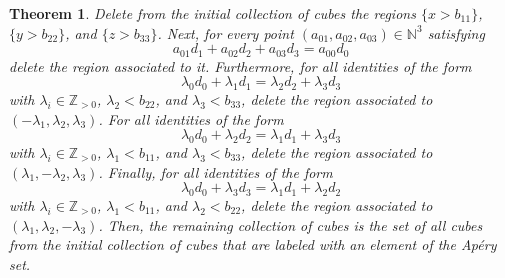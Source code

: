 \documentclass[12pt]{article}
\newtheorem{thm}{Theorem}[section]
\theoremstyle{remark}
\begin{document}
\begin{thm}\label{theoremprocedure}
    Delete from the initial collection of cubes the regions $\{x > b_{11}\}$, $\{y > b_{22}\}$, and $\{z > b_{33}\}$.
    Next, for every point $(a_{01},a_{02},a_{03}) \in \mathbb{N}^3$ satisfying
     \begin{equation}\label{minrelation-0}
          a_{01} d_1 + a_{02}d_2 + a_{03} d_3 = a_{00} d_0
     \end{equation}
    delete the region associated to it. 
    Furthermore, for all identities of the form
     \begin{equation}\label{theoremprocedure_eq1}
         \lambda_0d_0 + \lambda_1d_1=\lambda_2d_2 + \lambda_3d_3
     \end{equation}
    with $\lambda_i \in \mathbb{Z}_{>0}$, $\lambda_2 < b_{22}$, and $\lambda_3 < b_{33}$, delete the region associated to $(-\lambda_1,\lambda_2,\lambda_3)$. For all identities of the form
    \begin{equation}\label{theoremprocedure_eq2}
         \lambda_0d_0 + \lambda_2d_2=\lambda_1d_1 + \lambda_3d_3
    \end{equation}
    with $\lambda_i \in \mathbb{Z}_{>0}$, $\lambda_1 < b_{11}$, and $\lambda_3 < b_{33}$, delete the region associated to $(\lambda_1,-\lambda_2,\lambda_3)$. Finally, for all identities of the form
    \begin{equation}\label{theoremprocedure_eq3}
        \lambda_0d_0 + \lambda_3d_3=\lambda_1d_1 + \lambda_2d_2
    \end{equation}
    with $\lambda_i \in \mathbb{Z}_{>0}$, $\lambda_1 < b_{11}$, and $\lambda_2 < b_{22}$, delete the region associated to $(\lambda_1,\lambda_2,-\lambda_3)$.
    Then, the remaining collection of cubes is the set of all cubes from the initial collection of cubes that are labeled with an element of the Ap{\'e}ry set.
\end{thm}
\end{document}

